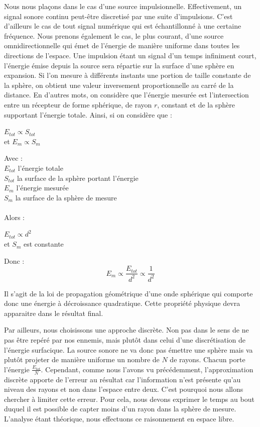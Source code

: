Nous nous plaçons dans le cas d'une source impulsionnelle. Effectivement, un signal sonore continu peut-être discretisé par une suite d'impulsions. C'est d'ailleurs le cas de tout signal numérique qui est échantillonné à une certaine fréquence. Nous prenons également le cas, le plus courant, d'une source omnidirectionnelle qui émet de l'énergie de manière uniforme dans toutes les directions de l'espace. Une impulsion étant un signal d'un temps infiniment court, l'énergie émise depuis la source sera répartie sur la surface d'une sphère en expansion. Si l'on mesure à différents instants une portion de taille constante de la sphère, on obtient une valeur inversement proportionnelle au carré de la distance. En d'autres mots, on considère que l'énergie mesurée est l'intersection entre un récepteur de forme sphérique, de rayon $r$, constant et de la sphère supportant l'énergie totale. Ainsi, si on considère que :

\begin{center}
   	$E_{tot} \propto S_{tot}$\\
	et $E_m \propto S_m$
\end{center}

Avec	: \\
$E_{tot}$ l'énergie totale \\
$S_{tot}$ la surface de la sphère portant l'énergie \\
$E_m$ l'énergie mesurée \\
$S_m$ la surface de la sphère de mesure \\
\\
Alors :
\begin{center}
   	$E_{tot} \propto d^2$\\
	et $S_m$ est constante\\
\end{center}

Donc :
\begin{equation}
	E_m \propto \frac{E_{tot}}{d^2} \propto \frac{1}{d^2}
\end{equation}


Il s'agit de la loi de propagation géométrique d'une onde sphérique qui comporte donc une énergie à décroissance quadratique. Cette propriété physique devra apparaitre dans le résultat final.

Par ailleurs, nous choisissons une approche discrète. Non pas dans le sens de ne pas être repéré par nos ennemis, mais plutôt dans celui d'une discrétisation de l'énergie surfacique. La source sonore ne va donc pas émettre une sphère mais va plutôt projeter de manière uniforme un nombre de $N$ de rayons. Chacun porte l'énergie $\frac{E_{tot}}{N}$. Cependant, comme nous l'avons vu précédemment, l'approximation discrète apporte de l'erreur au résultat car l'information n'est présente qu'au niveau des rayons et non dans l'espace entre deux. C'est pourquoi nous allons chercher à limiter cette erreur. Pour cela, nous devons exprimer le temps au bout duquel il est possible de capter moins d'un rayon dans la sphère de mesure. L'analyse étant théorique, nous effectuons ce raisonnement en espace libre. 

